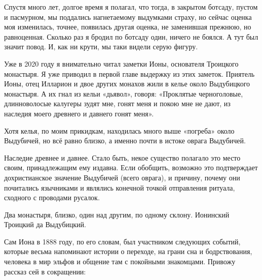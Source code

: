 Спустя много лет, долгое время я полагал, что тогда, в закрытом ботсаду, пустом и пасмурном, мы поддались нагнетаемому выдумками страху, но сейчас оценка моя изменилась, точнее, появилась другая оценка, не заменившая прежнюю, но равноценная. Сколько раз я бродил по ботсаду один, ничего не боялся. А тут был значит повод. И, как ни крути, мы таки видели серую фигуру.

Уже в 2020 году я внимательно читал заметки Ионы, основателя Троицкого монастыря. Я уже приводил в первой главе выдержку из этих заметок. Приятель Ионы, отец Илларион и двое других монахов жили в келье около Выдубицкого монастыря. А их гнал из кельи «дьявол», говоря:  «Проклятые черноголовые, длинноволосые калугеры зудят мне, гонят меня и покою мне не дают, из наследия моего древнего и давнего гонят меня».

Хотя келья, по моим прикидкам, находилась много выше «погреба» около Выдубичей, но всё равно близко, а именно почти в истоке оврага Выдубичей. 

Наследие древнее и давнее. Стало быть, некое существо полагало это место своим, принадлежащим ему издавна. Если обобщить, возможно это подтверждает дохристианское значение Выдубичей (всего оврага), и причину, почему они почитались язычниками и являлись конечной точкой отправления ритуала, сходного с проводами русалок.

Два монастыря, близко, один над другим, по одному склону. Ионинский Троицкий да Выдубицкий.

Сам Иона в 1888 году, по его словам, был участником следующих событий, которые весьма напоминают истории о переходе, на грани сна и бодрствования, человека в мир эльфов и общение там с покойными знакомцами. Привожу рассказ сей в сокращении:

